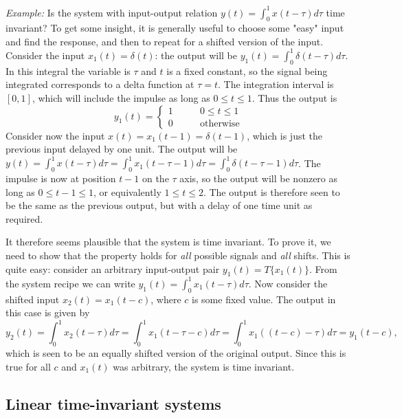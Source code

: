 \documentclass[10pt]{beamer}
\begin{document}
{\em Example:}  Is the system with input-output relation $y(t) = \int_{0}^1 x(t - \tau) d\tau$ time invariant?  To get some insight, it is generally useful to choose some "easy" input and find the response, and then to repeat for a shifted version of the input.  Consider the input $x_1(t) = \delta(t)$:  the output will be $y_1(t) = \int_0^1 \delta(t - \tau) d\tau$.  In this integral the variable is $\tau$ and $t$ is a fixed constant, so the signal being integrated corresponds to a delta function at $\tau = t$.  The integration interval is $[0,1]$, which will include the impulse as long as $0 \leq t \leq 1$.  Thus the output is
\begin{equation*}
  y_1(t) = \begin{cases} 
  1 \qquad & 0 \leq t \leq 1 \\
  0 \qquad & \text{otherwise}
  \end{cases}
\end{equation*}
Consider now the input $x(t) = x_1(t-1) = \delta(t-1)$, which is just the previous input delayed by one unit.  The output will be $y(t) = \int_{0}^1 x(t - \tau) d\tau = \int_{0}^1 x_1(t - \tau - 1) d\tau = \int_{0}^1 \delta(t - \tau - 1) d\tau$.  The impulse is now at position $t-1$ on the $\tau$ axis, so the output will be nonzero as long as $0 \leq t-1 \leq 1$, or equivalently $1 \leq t \leq 2$.  The output is therefore seen to be the same as the previous output, but with a delay of one time unit as required.

It therefore seems plausible that the system is time invariant.  To prove it, we need to show that the property holds for {\em all} possible signals and {\em all} shifts.  This is quite easy:  consider an arbitrary input-output pair $y_1(t) = T\{x_1(t)\}$.  From the system recipe we can write $y_1(t) = \int_{0}^1 x_1(t - \tau) d\tau$.  Now consider the shifted input $x_2(t) = x_1(t - c)$, where $c$ is some fixed value.  The output in this case is given by
\begin{equation*}
  y_2(t) = \int_{0}^1 x_2(t - \tau) d\tau = \int_{0}^1 x_1(t - \tau - c) d\tau = \int_{0}^1 x_1((t - c) - \tau) d\tau = y_1(t-c),
\end{equation*}
which is seen to be an equally shifted version of the original output.  Since this is true for all $c$ and $x_1(t)$ was arbitrary, the system is time invariant.

\subsection{Linear time-invariant systems}
\end{document}
